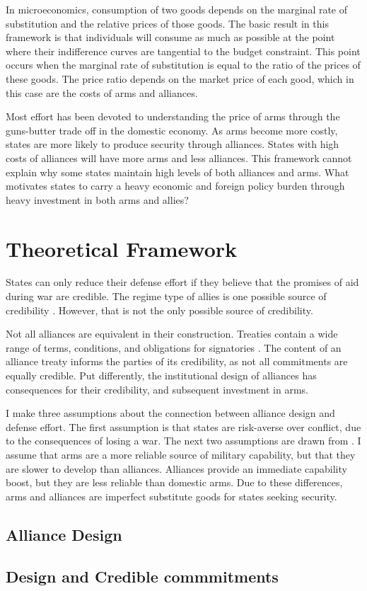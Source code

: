 \documentclass[12pt]{article}
\begin{document}
In microeconomics, consumption of two goods depends on the marginal rate of substitution and the relative prices of those goods. The basic result in this framework is that individuals will consume as much as possible at the point where their indifference curves are tangential to the budget constraint. This point occurs when the marginal rate of substitution is equal to the ratio of the prices of these goods. The price ratio depends on the market price of each good, which in this case are the costs of arms and alliances. 

Most effort has been devoted to understanding the price of arms through the guns-butter trade off in the domestic economy. As arms become more costly, states are more likely to produce security through alliances. States with high costs of alliances will have more arms and less alliances. This framework cannot explain why some states maintain high levels of both alliances and arms. What motivates states to carry a heavy economic and foreign policy burden through heavy investment in both arms and allies? 

\section*{Theoretical Framework} 

States can only reduce their defense effort if they believe that the promises of aid during war are credible. The regime type of allies is one possible source of credibility \citep{DigiuseppePoast2016}. However, that is not the only possible source of credibility. 

Not all alliances are equivalent in their construction. Treaties contain a wide range of terms, conditions, and obligations for signatories \citep{Benson2011, Chibaetal2015}. The content of an alliance treaty informs the parties of its credibility, as not all commitments are equally credible. Put differently, the institutional design of alliances has consequences for their credibility, and subsequent investment in arms. 

I make three assumptions about the connection between alliance design and defense effort. The first assumption is that states are risk-averse over conflict, due to the consequences of losing a war. The next two assumptions are drawn from \citep{Morrow1993}. I assume that arms are a more reliable source of military capability, but that they are slower to develop than alliances. Alliances provide an immediate capability boost, but they are less reliable than domestic arms. Due to these differences, arms and alliances are imperfect substitute goods for states seeking security. 


\subsection{Alliance Design}




\subsection{Design and Credible commmitments}










  
% 
\end{document}
